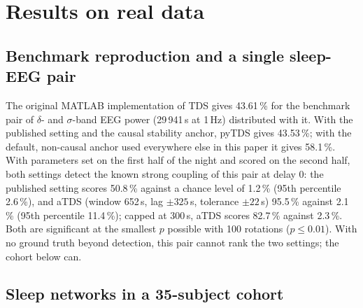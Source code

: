 \documentclass[11pt,a4paper]{article}
\begin{document}
\section{Results on real data}
\label{sec:realdata}
\subsection{Benchmark reproduction and a single sleep-EEG pair}
\label{sec:res-benchmark}
The original MATLAB implementation of TDS gives 43.61\,\% for the benchmark pair of $\delta$- and $\sigma$-band EEG power (29\,941\,s at 1\,Hz) distributed with it. With the published setting and the causal stability anchor, pyTDS gives 43.53\,\%; with the default, non-causal anchor used everywhere else in this paper it gives 58.1\,\%. With parameters set on the first half of the night and scored on the second half, both settings detect the known strong coupling of this pair at delay 0: the published setting scores 50.8\,\% against a chance level of 1.2\,\% (95th percentile 2.6\,\%), and aTDS (window 652\,s, lag $\pm325$\,s, tolerance $\pm22$\,s) 95.5\,\% against 2.1\,\% (95th percentile 11.4\,\%); capped at 300\,s, aTDS scores 82.7\,\% against 2.3\,\%. Both are significant at the smallest $p$ possible with 100 rotations ($p \le 0.01$). With no ground truth beyond detection, this pair cannot rank the two settings; the cohort below can.

\subsection{Sleep networks in a 35-subject cohort}
\label{sec:res-cohort}
\end{document}
